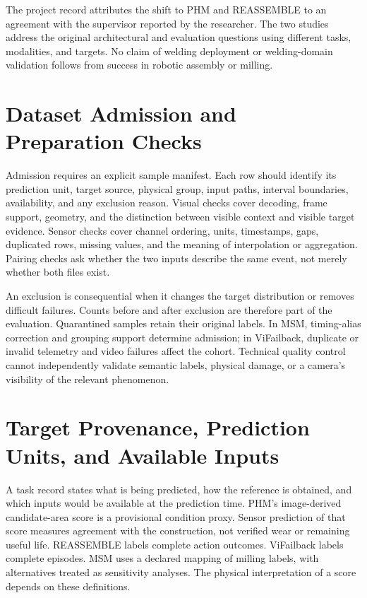 The project record attributes the shift to PHM and REASSEMBLE to an agreement with the supervisor reported by the researcher. The two studies address the original architectural and evaluation questions using different tasks, modalities, and targets. No claim of welding deployment or welding-domain validation follows from success in robotic assembly or milling.

\section{Dataset Admission and Preparation Checks}
Admission requires an explicit sample manifest. Each row should identify its prediction unit, target source, physical group, input paths, interval boundaries, availability, and any exclusion reason. Visual checks cover decoding, frame support, geometry, and the distinction between visible context and visible target evidence. Sensor checks cover channel ordering, units, timestamps, gaps, duplicated rows, missing values, and the meaning of interpolation or aggregation. Pairing checks ask whether the two inputs describe the same event, not merely whether both files exist.

An exclusion is consequential when it changes the target distribution or removes difficult failures. Counts before and after exclusion are therefore part of the evaluation. Quarantined samples retain their original labels. In MSM, timing-alias correction and grouping support determine admission; in ViFailback, duplicate or invalid telemetry and video failures affect the cohort. Technical quality control cannot independently validate semantic labels, physical damage, or a camera's visibility of the relevant phenomenon.

\section{Target Provenance, Prediction Units, and Available Inputs}
A task record states what is being predicted, how the reference is obtained, and which inputs would be available at the prediction time. PHM's image-derived candidate-area score is a provisional condition proxy. Sensor prediction of that score measures agreement with the construction, not verified wear or remaining useful life. REASSEMBLE labels complete action outcomes. ViFailback labels complete episodes. MSM uses a declared mapping of milling labels, with alternatives treated as sensitivity analyses. The physical interpretation of a score depends on these definitions.


